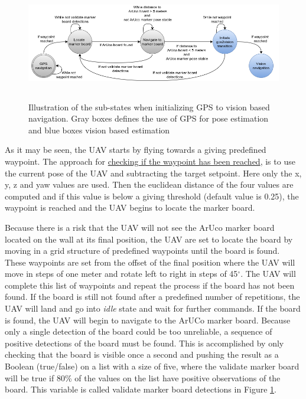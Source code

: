 \documentclass[../Head/report.tex]{subfiles}
\begin{document}
\begin{figure}[H]
    \centering
    \includegraphics[height=5.0cm]{../Figures/state_machine_gps2vision_transition.png}
    \caption{Illustration of the sub-states when initializing GPS to vision based navigation. Gray boxes defines the use of GPS for pose estimation and blue boxes vision based estimation}
    \label{fig:state_machine_gps2vision_transition}
\end{figure}

As it may be seen, the UAV starts by flying towards a giving predefined waypoint. The approach for \href{https://github.com/Kenil16/master_project/blob/master/software/ros_workspace/src/offboard_control/waypoint_checking.py}{checking if the waypoint has been reached}, is to use the current pose of the UAV and subtracting the target setpoint. Here only the x, y, z and yaw values are used. Then the euclidean distance of the four values are computed and if this value is below a giving threshold (default value is 0.25), the waypoint is reached and the UAV begins to locate the marker board. 

Because there is a risk that the UAV will not see the ArUco marker board located on the wall at its final position, the UAV are set to locate the board by moving in a grid structure of predefined waypoints until the board is found. These waypoints are set from the offset of the final position where the UAV will move in steps of one meter and rotate left to right in steps of 45$^{\circ}$. The UAV will complete this list of waypoints and repeat the process if the board has not been found. If the board is still not found after a predefined number of repetitions, the UAV will land and go into \textit{idle} state and wait for further commands. If the board 
is found, the UAV will begin to navigate to the ArUCo marker board. Because only a single detection of the board could be too unreliable, a sequence of positive detections of the board must be found. This is accomplished by only checking that the board is visible once a second and pushing the result as a Boolean (true/false) on a list with a size of five, where the validate marker board will be true if 80\% of the values on the list have positive observations of the board. This variable is called validate marker board detections in Figure \ref{fig:state_machine_gps2vision_transition}.
\end{document}
